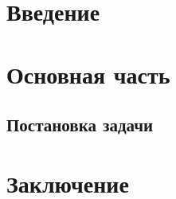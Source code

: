 \documentclass{article}
\begin{document}
\section{Введение}

\section{Основная часть}
\subsection{Постановка задачи}
\subsection{}
\subsection{}

\section{Заключение}
\end{document}
